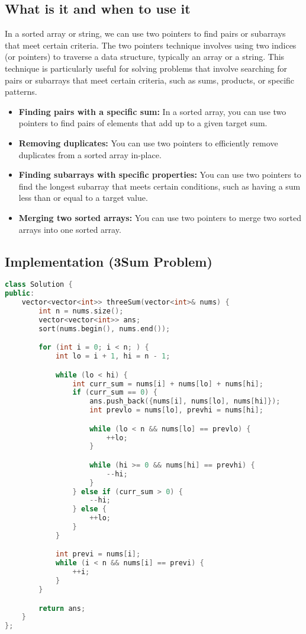 \documentclass[12pt]{article}
\begin{document}
\subsection{What is it and when to use it}
In a sorted array or string, we can use two pointers to find pairs or subarrays that meet certain criteria.
The two pointers technique involves using two indices (or pointers) to traverse a data structure, typically an array or a string. This technique is particularly useful for solving problems that involve searching for pairs or subarrays that meet certain criteria, such as sums, products, or specific patterns.
\begin{itemize}
    \item \textbf{Finding pairs with a specific sum:} In a sorted array, you can use two pointers to find pairs of elements that add up to a given target sum.
    \item \textbf{Removing duplicates:} You can use two pointers to efficiently remove duplicates from a sorted array in-place.
    \item \textbf{Finding subarrays with specific properties:} You can use two pointers to find the longest subarray that meets certain conditions, such as having a sum less than or equal to a target value.
    \item \textbf{Merging two sorted arrays:} You can use two pointers to merge two sorted arrays into one sorted array.
\end{itemize}

\subsection{Implementation (3Sum Problem)}
\begin{lstlisting}[language=C++]
class Solution {
public:
    vector<vector<int>> threeSum(vector<int>& nums) {
        int n = nums.size();
        vector<vector<int>> ans;
        sort(nums.begin(), nums.end());

        for (int i = 0; i < n; ) {
            int lo = i + 1, hi = n - 1;

            while (lo < hi) {
                int curr_sum = nums[i] + nums[lo] + nums[hi];
                if (curr_sum == 0) {
                    ans.push_back({nums[i], nums[lo], nums[hi]});
                    int prevlo = nums[lo], prevhi = nums[hi];

                    while (lo < n && nums[lo] == prevlo) {
                        ++lo;
                    }

                    while (hi >= 0 && nums[hi] == prevhi) {
                        --hi;
                    }
                } else if (curr_sum > 0) {
                    --hi;
                } else {
                    ++lo;
                }
            }

            int previ = nums[i];
            while (i < n && nums[i] == previ) {
                ++i;
            }
        }

        return ans;
    }
};
\end{lstlisting}
\end{document}
